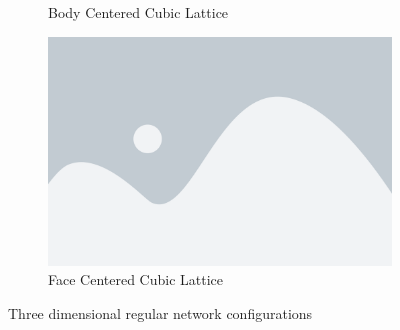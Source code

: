 \begin{figure}[p]
\begin{subfigure}[b]{0.45\textwidth}
    \caption{Body Centered Cubic Lattice}
    \label{fig:body centered cubic lattice}
  \end{subfigure}
  \hfill
  \begin{subfigure}[b]{0.45\textwidth}
    \centering
    \includegraphics[width=\textwidth]{placeholder}
    \caption{Face Centered Cubic Lattice}
    \label{fig:face centered cubic lattice}
  \end{subfigure}
  \caption{Three dimensional regular network configurations}
  \label{fig:three dimensional networks}
\end{figure}
